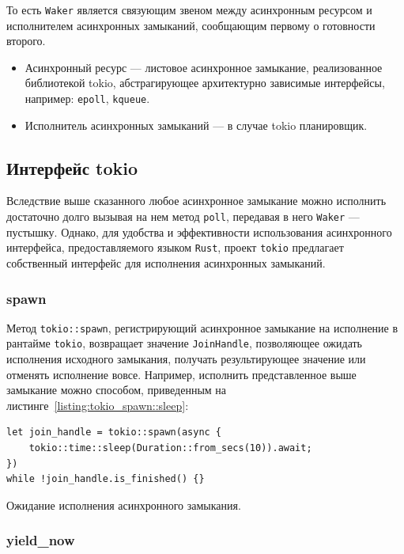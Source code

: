 То есть \verb|Waker| является связующим звеном между асинхронным ресурсом и исполнителем асинхронных замыканий, сообщающим первому о готовности второго.

\begin{itemize}
    \item Асинхронный ресурс --- листовое асинхронное замыкание, реализованное библиотекой tokio, абстрагирующее архитектурно зависимые интерфейсы, например: \verb|epoll|, \verb|kqueue|.
    \item Исполнитель асинхронных замыканий --- в случае tokio планировщик.
\end{itemize}

\subsection{Интерфейс tokio}

Вследствие выше сказанного любое асинхронное замыкание можно исполнить достаточно долго вызывая на нем метод \verb|poll|, передавая в него \verb|Waker| --- пустышку. Однако, для удобства и эффективности использования асинхронного интерфейса, предоставляемого языком \verb|Rust|, проект \verb|tokio| предлагает собственный интерфейс для исполнения асинхронных замыканий.

\subsubsection{spawn}

Метод \verb|tokio::spawn|, регистрирующий асинхронное замыкание на исполнение в рантайме \verb|tokio|, возвращает значение \verb|JoinHandle|, позволяющее ожидать исполнения исходного замыкания, получать результирующее значение или отменять исполнение вовсе. Например, исполнить представленное выше замыкание можно способом, приведенным на листинге~\ref{listing:tokio_spawn::sleep}:

\begin{listing}[H]
    \begin{verbatim}
let join_handle = tokio::spawn(async {
    tokio::time::sleep(Duration::from_secs(10)).await;
})
while !join_handle.is_finished() {}
    \end{verbatim}

    \caption{Ожидание исполнения асинхронного замыкания.}
    \label{listing:tokio_spawn::sleep}
\end{listing}

\subsubsection{yield\_now}

